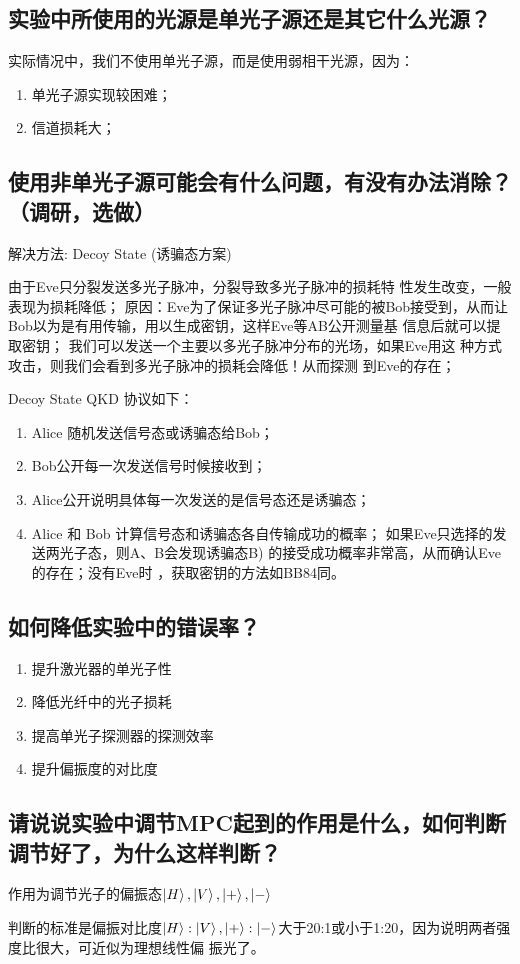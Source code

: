 \documentclass[a4paper,UTF8]{ctexart}
\begin{document}
\subsection{实验中所使用的光源是单光子源还是其它什么光源？}

实际情况中，我们不使用单光子源，而是使用弱相干光源，因为：

\begin{enumerate}
    \item 单光子源实现较困难；
    \item 信道损耗大；
\end{enumerate}

\subsection{使用非单光子源可能会有什么问题，有没有办法消除？（调研，选做）}

解决方法: Decoy State (诱骗态方案)

由于Eve只分裂发送多光子脉冲，分裂导致多光子脉冲的损耗特
性发生改变，一般表现为损耗降低；
原因：Eve为了保证多光子脉冲尽可能的被Bob接受到，从而让
Bob以为是有用传输，用以生成密钥，这样Eve等AB公开测量基
信息后就可以提取密钥；
我们可以发送一个主要以多光子脉冲分布的光场，如果Eve用这
种方式攻击，则我们会看到多光子脉冲的损耗会降低！从而探测
到Eve的存在；

Decoy State QKD 协议如下：

\begin{enumerate}
    \item Alice 随机发送信号态或诱骗态给Bob；
    \item  Bob公开每一次发送信号时候接收到；
    \item Alice公开说明具体每一次发送的是信号态还是诱骗态；
    \item Alice 和 Bob 计算信号态和诱骗态各自传输成功的概率；
如果Eve只选择的发送两光子态，则A、B会发现诱骗态B)
的接受成功概率非常高，从而确认Eve的存在；没有Eve时
，获取密钥的方法如BB84同。
\end{enumerate}

\subsection{如何降低实验中的错误率？}

\begin{enumerate}
    \item 提升激光器的单光子性
    \item 降低光纤中的光子损耗
    \item 提高单光子探测器的探测效率
    \item 提升偏振度的对比度
\end{enumerate}

\subsection{请说说实验中调节MPC起到的作用是什么，如何判断调节好了，为什么这样判断？}

作用为调节光子的偏振态$\ket{H},\ket{V},\ket{+},\ket{-}$

判断的标准是偏振对比度$\ket{H}:\ket{V}, \ket{+}:\ket{-}$大于20:1或小于1:20，因为说明两者强度比很大，可近似为理想线性偏
振光了。
\end{document}
